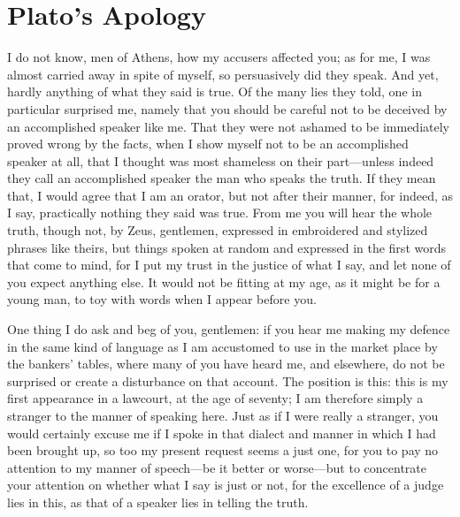 \chapter{Plato's Apology}
\label{platoapology}
I do not know, men of Athens, how my
accusers affected you; as for me, I was almost
carried away in spite of myself, so persuasively
did they speak. And yet, hardly anything of
what they said is true. Of the many lies they
told, one in particular surprised me, namely
that you should be careful not to be deceived
by an accomplished speaker like me. That they
were not ashamed to be immediately proved
wrong by the facts, when I show myself not to
be an accomplished speaker at all, that I
thought was most shameless on their
part—unless indeed they call an accomplished
speaker the man who speaks the truth. If they
mean that, I would agree that I am an orator,
but not after their manner, for indeed, as I say, practically nothing they said was true. From me you
will hear the whole truth, though not, by Zeus, gentlemen, expressed in embroidered and stylized
phrases like theirs, but things spoken at random and expressed in the first words that come to mind,
for I put my trust in the justice of what I say, and let none of you expect anything else. It would
not be fitting at my age, as it might be for a young man, to toy with words when I appear before
you.

One thing I do ask and beg of you, gentlemen: if you hear me making my defence in the same
kind of language as I am accustomed to use in the market place by the bankers' tables, where many
of you have heard me, and elsewhere, do not be surprised or create a disturbance on that account.
The position is this: this is my first appearance in a lawcourt, at the age of seventy; I am therefore
simply a stranger to the manner of speaking here. Just as if I were really a stranger, you would
certainly excuse me if I spoke in that dialect and manner in which I had been brought up, so too
my present request seems a just one, for you to pay no attention to my manner of speech—be it
better or worse—but to concentrate your attention on whether what I say is just or not, for the
excellence of a judge lies in this, as that of a speaker lies in telling the truth.

